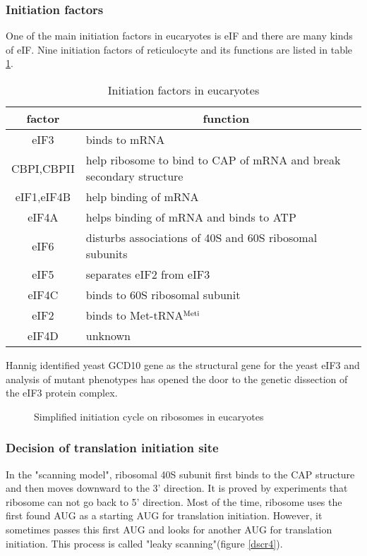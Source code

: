 \subsubsection{Initiation factors}
One of the main initiation factors in eucaryotes is eIF and there are
many kinds of eIF. Nine initiation factors of reticulocyte and its
functions are listed in table \ref{eif}.
\begin{table}
\begin{tabular}{|c|l|}
\hline
factor & ~~~~~~~~~~~~~~~~~~function\\
\hline
eIF3 & binds to mRNA\\
CBPI,CBPII & help ribosome to bind to CAP of mRNA and break secondary structure \\
eIF1,eIF4B & help binding of mRNA\\
eIF4A & helps binding of mRNA and binds to ATP\\
eIF6 & disturbs associations of 40S and 60S ribosomal subunits\\ 
eIF5 & separates eIF2 from eIF3\\
eIF4C & binds to 60S ribosomal subunit\\
eIF2 & binds to Met-tRNA$^{\rm Meti}$\\
eIF4D& unknown \\
\hline
\end{tabular}
\caption{Initiation factors in eucaryotes}
\label{eif}
\end{table}
Hannig identified yeast GCD10 gene as the structural gene for the yeast
eIF3 and analysis of mutant phenotypes has opened the door to the genetic
dissection of the eIF3 protein complex\cite{label24}.

\begin{figure}
\begin{center}
\end{center}
\caption{Simplified initiation cycle on ribosomes in eucaryotes}
\end{figure}

\subsubsection{Decision of translation initiation site}
In the "scanning model", ribosomal 40S subunit first binds to the CAP
structure and then moves downward to the 3' direction.  It is proved
by experiments that ribosome can not go back to 5'
direction\cite{label1}. Most of the time, ribosome uses the first
found AUG as a starting AUG for translation initiation.  However, it
sometimes passes this first AUG and looks for another AUG for
translation initiation.  This process is called "leaky
scanning"(figure \ref{dscr4}).

